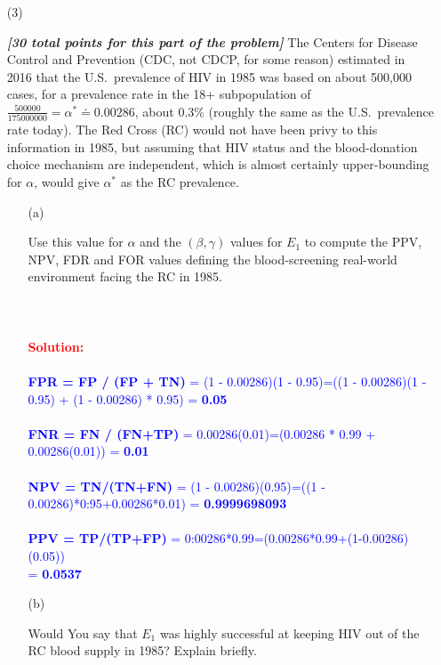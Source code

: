 \documentclass[12pt]{article}
\newcommand{\bi}[1]{\b{\i{#1}}}
\renewcommand{\b}[1]{\textbf{#1}}
\renewcommand{\i}[1]{\textit{#1}}
\begin{document}
\begin{itemize}
\begin{itemize}
\begin{itemize}
\end{itemize}

\item[(3)]

\bi{[30 total points for this part of the problem]} The Centers for Disease Control and Prevention (CDC, not CDCP, for some reason) estimated in 2016 that the U.S.~prevalence of HIV in 1985 was based on about 500,000 cases, for a prevalence rate in the 18+ subpopulation of $\frac{ 500000 }{ 175000000 } = \alpha^* \doteq 0.00286$, about 0.3\% (roughly the same as the U.S.~prevalence rate today). The Red Cross (RC) would not have been privy to this information in 1985, but assuming that HIV status and the blood-donation choice mechanism are independent, which is almost certainly upper-bounding for $\alpha$, would give $\alpha^*$ as the RC prevalence. 

\begin{itemize}

\item[(a)]

Use this value for $\alpha$ and the $( \beta, \gamma )$ values for $E_1$ to compute the PPV, NPV, FDR and FOR values defining the blood-screening real-world environment facing the RC in 1985. \fbox{\bi{[20 points]}}
\\ \\ \\ \\ 
\textcolor{red}{\textbf{Solution:}} \\ \\
\textcolor{blue}{\textbf{FPR = FP / (FP + TN)} = (1 - 0.00286)(1 - 0.95)=((1 - 0.00286)(1 - 0.95) +
(1 - 0.00286) * 0.95) = \textbf{0.05} \\ \\
\textbf{FNR = FN / (FN+TP)} = 0.00286(0.01)=(0.00286 * 0.99 + 0.00286(0.01)) = \textbf{0.01}
\\ \\ \textbf{NPV = TN/(TN+FN)} = (1 - 0.00286)(0.95)=((1 - 0.00286)*0:95+0.00286*0.01) = \textbf{0.9999698093}
\\ \\ \textbf{PPV = TP/(TP+FP)} = 0:00286*0.99=(0.00286*0.99+(1-0.00286)(0.05)) \\ = \textbf{0.0537} \\
}

\item[(b)]

Would You say that $E_1$ was highly successful at keeping HIV out of the RC blood supply in 1985? Explain briefly. \fbox{\bi{[10 points]}}


\end{itemize}
\end{itemize}
\end{itemize}
\end{document}

